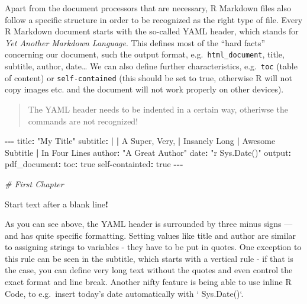 \documentclass[
]{book}
\newenvironment{Shaded}{\begin{snugshade}}{\end{snugshade}}
\newcommand{\CommentTok}[1]{\textcolor[rgb]{0.56,0.35,0.01}{\textit{#1}}}
\newcommand{\ErrorTok}[1]{\textcolor[rgb]{0.64,0.00,0.00}{\textbf{#1}}}
\newcommand{\NormalTok}[1]{#1}
\newcommand{\SpecialCharTok}[1]{\textcolor[rgb]{0.81,0.36,0.00}{\textbf{#1}}}
\newcommand{\StringTok}[1]{\textcolor[rgb]{0.31,0.60,0.02}{#1}}
\begin{document}
Apart from the document processors that are necessary, R Markdown files also follow a specific structure in order to be recognized as the right type of file.
Every R Markdown document starts with the so-called YAML header, which stands for \emph{Yet Another Markdown Language}.
This defines most of the ``hard facts'' concerning our document, such the output format, e.g.~\texttt{html\_document}, title, subtitle, author, date\ldots{}
We can also define further characteristics, e.g.~\texttt{toc} (table of content) or \texttt{self-contained} (this should be set to true, otherwise R will not copy images etc. and the document will not work properly on other devices).

\begin{quote}
The YAML header needs to be indented in a certain way, otheriwse the commands are not recognized!
\end{quote}

\begin{Shaded}
\begin{Highlighting}[]
\SpecialCharTok{{-}{-}{-}}
\NormalTok{title}\SpecialCharTok{:} \StringTok{"My Title"}
\NormalTok{subtitle}\SpecialCharTok{:} \ErrorTok{|}
    \ErrorTok{|}\NormalTok{ A Super, Very,}
    \SpecialCharTok{|}\NormalTok{ Insanely Long}
    \SpecialCharTok{|}\NormalTok{ Awesome Subtitle}
    \SpecialCharTok{|}\NormalTok{ In Four Lines}
\NormalTok{author}\SpecialCharTok{:} \StringTok{"A Great Author"}
\NormalTok{date}\SpecialCharTok{:} \StringTok{"\textasciigrave{}r Sys.Date()\textasciigrave{}"}
\NormalTok{output}\SpecialCharTok{:} 
\NormalTok{  pdf\_document}\SpecialCharTok{:}
\NormalTok{    toc}\SpecialCharTok{:}\NormalTok{ true}
\NormalTok{    self}\SpecialCharTok{{-}}\NormalTok{containted}\SpecialCharTok{:}\NormalTok{ true}
\SpecialCharTok{{-}{-}{-}}

\CommentTok{\# First Chapter}

\NormalTok{Start text after a blank line}\SpecialCharTok{!} 
\end{Highlighting}
\end{Shaded}

As you can see above, the YAML header is surrounded by three minus signs --- and has quite specific formatting.
Setting values like title and author are similar to assigning strings to variables - they have to be put in quotes.
One exception to this rule can be seen in the subtitle, which starts with a vertical rule \textbar{} - if that is the case, you can define very long text without the quotes and even control the exact format and line break.
Another nifty feature is being able to use inline R Code, to e.g.~insert today's date automatically with ` Sys.Date()`.
\end{document}
